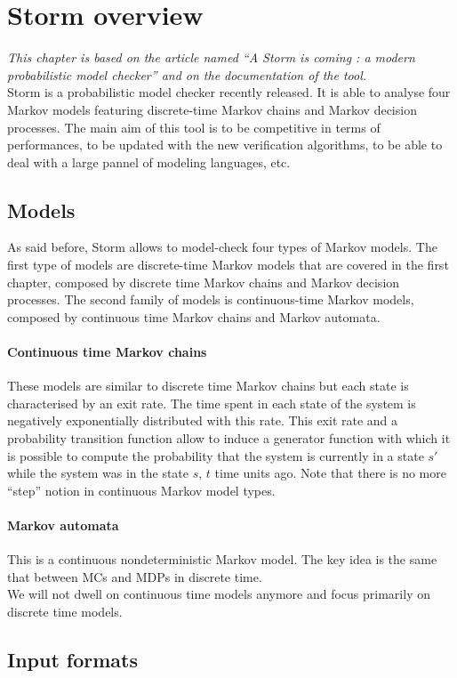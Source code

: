 \chapter{Storm overview}
\textit{This chapter is based on the article named ``A Storm is coming : a modern probabilistic model checker'' \cite{storm1} and on the documentation of the tool.} \\

Storm is a probabilistic model checker recently released. It is able to analyse
four Markov models featuring discrete-time Markov chains and Markov decision processes. The main aim of this tool is to be competitive in terms of performances, to be updated with the new verification algorithms, to be able to
deal with a large pannel of modeling languages, etc.

\section{Models}
As said before, Storm allows to model-check four types of Markov models.
The first type of models are discrete-time Markov models that are covered in the first chapter, composed by
discrete time Markov chains and Markov decision processes.
The second family of models is continuous-time Markov models, composed by continuous time Markov chains and Markov automata.
\subsubsection*{Continuous time Markov chains}
These models are similar to discrete time Markov chains but each state is
characterised by an exit rate.
The time spent in each state of the system is negatively exponentially distributed with this rate.
This exit rate and a probability transition function allow to induce a generator
function with which it is possible to compute the probability
that the system is currently in a state $s'$ while the system was in the state $s$, $t$ time units ago. Note that there is no more ``step'' notion in continuous
Markov model types.
\subsubsection*{Markov automata}
This is a continuous nondeterministic Markov model. The key idea is the same that between MCs and MDPs in discrete time. \\

We will not dwell on continuous time models anymore and focus primarily on discrete time models.

\section{Input formats}

